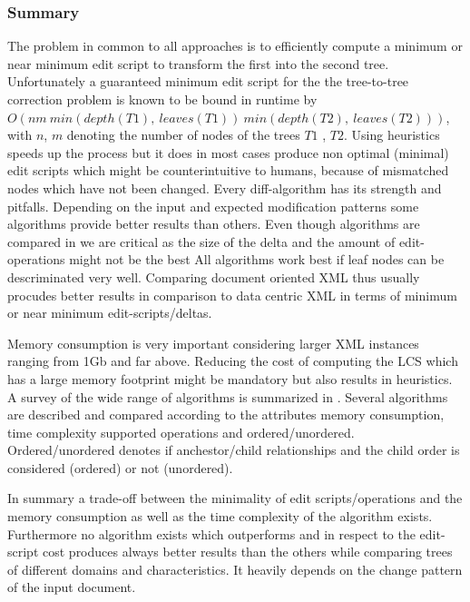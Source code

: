 \subsubsection{Summary}
The problem in common to all approaches is to efficiently compute a minimum or near minimum edit script to transform the first into the second tree. Unfortunately a guaranteed minimum edit script for the the tree-to-tree correction problem is known to be bound in runtime by \\$O(nm\ min(depth(T1),\ leaves(T1))\ min(depth(T2),\ leaves(T2)))$, with $n$, $m$ denoting the number of nodes of the trees $T1$ , $T2$. Using heuristics speeds up the process but it does in most cases produce non optimal (minimal) edit scripts which might be counterintuitive to humans, because of mismatched nodes which have not been changed. Every diff-algorithm has its strength and pitfalls. Depending on the input and expected modification patterns some algorithms provide better results than others. Even though algorithms are compared in \cite{} we are critical as the size of the delta and the amount of edit-operations might not be the best  All algorithms work best if leaf nodes can be descriminated very well. Comparing document oriented XML thus usually procudes better results in comparison to data centric XML in terms of minimum or near minimum edit-scripts/deltas.

Memory consumption is very important considering larger XML instances ranging from 1Gb and far above. Reducing the cost of computing the LCS which has a large memory footprint might be mandatory but also results in heuristics. A survey of the wide range of algorithms is summarized in \cite{cobena2002comparative}. Several algorithms are described and compared according to the attributes memory consumption, time complexity supported operations and ordered/unordered. Ordered/unordered denotes if anchestor/child relationships and the child order is considered (ordered) or not (unordered). 

In summary a trade-off between the minimality of edit scripts/operations and the memory consumption as well as the time complexity of the algorithm exists. Furthermore no algorithm exists which outperforms and in respect to the edit-script cost produces always better results than the others while comparing trees of different domains and characteristics. It heavily depends on the change pattern of the input document.

